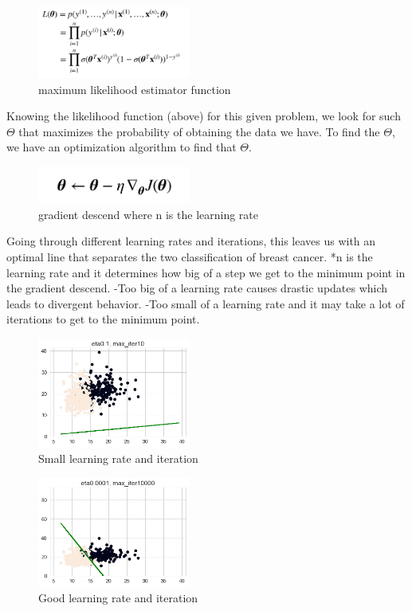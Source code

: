\documentclass[conference]{IEEEtran}
\begin{document}
\begin{figure}[htbp]
\centerline{\includegraphics[width=50mm,scale=0.5]{imgs/max_like}}
\caption{maximum likelihood estimator function}
\label{fig}
\end{figure}
Knowing the likelihood function (above) for this given problem, we look for such $\Theta$ that maximizes the probability of obtaining the data we have. To find the $\Theta$, we have an optimization algorithm to find that $\Theta$.
\begin{figure}[htbp]
\centerline{\includegraphics[width=50mm,scale=0.5]{imgs/gradient}}
\caption{gradient descend where n is the learning rate }
\label{fig}
\end{figure}

Going through different learning rates and iterations, this leaves us with an optimal line that separates the two classification of breast cancer. *n is the learning rate and it determines how big of a step we get to the minimum point in the gradient descend.  
\noindent-Too big of a learning rate causes drastic updates which leads to divergent behavior. 
\noindent-Too small of a learning rate and it may take a lot of iterations to get to the minimum point. 
\begin{figure}[htbp]
\centerline{\includegraphics[width=50mm,scale=0.5]{imgs/output_20_1.png}}
\caption{Small learning rate and iteration}
\label{fig}
\end{figure}
\begin{figure}[htbp]
\centerline{\includegraphics[width=50mm,scale=0.5]{imgs/output_20_16.png}}
\caption{Good learning rate and iteration}
\label{fig}
\end{figure}
\end{document}
